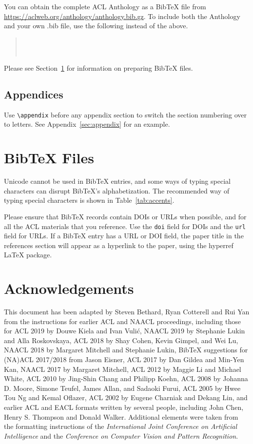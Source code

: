 \documentclass[11pt]{article}
\begin{document}
 You can obtain the complete ACL Anthology as a Bib\TeX{} file from \url{https://aclweb.org/anthology/anthology.bib.gz}.
 To include both the Anthology and your own .bib file, use the following instead of the above.
 \begin{quote}
 \begin{verbatim}
 
 
 \end{verbatim}
 \end{quote}

 Please see Section~\ref{sec:bibtex} for information on preparing Bib\TeX{} files.

 \subsection{Appendices}

 Use \verb|\appendix| before any appendix section to switch the section numbering over to letters. See Appendix~\ref{sec:appendix} for an example.

 \section{Bib\TeX{} Files}
 \label{sec:bibtex}

 Unicode cannot be used in Bib\TeX{} entries, and some ways of typing special characters can disrupt Bib\TeX's alphabetization. The recommended way of typing special characters is shown in Table~\ref{tab:accents}.

 Please ensure that Bib\TeX{} records contain DOIs or URLs when possible, and for all the ACL materials that you reference.
 Use the \verb|doi| field for DOIs and the \verb|url| field for URLs.
 If a Bib\TeX{} entry has a URL or DOI field, the paper title in the references section will appear as a hyperlink to the paper, using the hyperref \LaTeX{} package.

 \section*{Acknowledgements}

 This document has been adapted
 by Steven Bethard, Ryan Cotterell and Rui Yan
 from the instructions for earlier ACL and NAACL proceedings, including those for 
 ACL 2019 by Douwe Kiela and Ivan Vuli\'{c},
 NAACL 2019 by Stephanie Lukin and Alla Roskovskaya, 
 ACL 2018 by Shay Cohen, Kevin Gimpel, and Wei Lu, 
 NAACL 2018 by Margaret Mitchell and Stephanie Lukin,
 Bib\TeX{} suggestions for (NA)ACL 2017/2018 from Jason Eisner,
 ACL 2017 by Dan Gildea and Min-Yen Kan, 
 NAACL 2017 by Margaret Mitchell, 
 ACL 2012 by Maggie Li and Michael White, 
 ACL 2010 by Jing-Shin Chang and Philipp Koehn, 
 ACL 2008 by Johanna D. Moore, Simone Teufel, James Allan, and Sadaoki Furui, 
 ACL 2005 by Hwee Tou Ng and Kemal Oflazer, 
 ACL 2002 by Eugene Charniak and Dekang Lin, 
 and earlier ACL and EACL formats written by several people, including
 John Chen, Henry S. Thompson and Donald Walker.
 Additional elements were taken from the formatting instructions of the \emph{International Joint Conference on Artificial Intelligence} and the \emph{Conference on Computer Vision and Pattern Recognition}.
\end{document}
